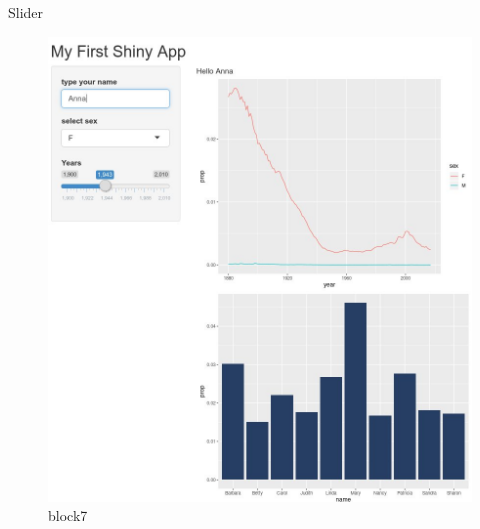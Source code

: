 \documentclass[
  ignorenonframetext,
]{beamer}
\begin{document}
\begin{frame}{Slider}
\protect\hypertarget{slider}{}

\begin{figure}
\centering
\includegraphics{images/slider.jpg}
\caption{block7}
\end{figure}

\end{frame}
\end{document}
